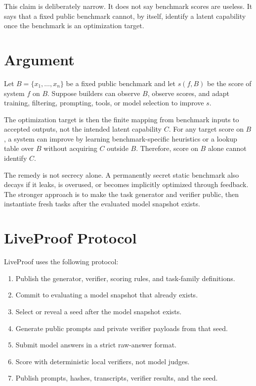 \documentclass[11pt]{article}
\begin{document}
This claim is deliberately narrow. It does not say benchmark scores are useless.
It says that a fixed public benchmark cannot, by itself, identify a latent
capability once the benchmark is an optimization target.

\section{Argument}

Let $B = \{x_1, \ldots, x_n\}$ be a fixed public benchmark and let $s(f, B)$ be
the score of system $f$ on $B$. Suppose builders can observe $B$, observe scores,
and adapt training, filtering, prompting, tools, or model selection to improve
$s$.

The optimization target is then the finite mapping from benchmark inputs to
accepted outputs, not the intended latent capability $C$. For any target score
on $B$, a system can improve by learning benchmark-specific heuristics or a
lookup table over $B$ without acquiring $C$ outside $B$. Therefore, score on $B$
alone cannot identify $C$.

The remedy is not secrecy alone. A permanently secret static benchmark also
decays if it leaks, is overused, or becomes implicitly optimized through
feedback. The stronger approach is to make the task generator and verifier
public, then instantiate fresh tasks after the evaluated model snapshot exists.

\section{LiveProof Protocol}

LiveProof uses the following protocol:

\begin{enumerate}
\item Publish the generator, verifier, scoring rules, and task-family definitions.
\item Commit to evaluating a model snapshot that already exists.
\item Select or reveal a seed after the model snapshot exists.
\item Generate public prompts and private verifier payloads from that seed.
\item Submit model answers in a strict raw-answer format.
\item Score with deterministic local verifiers, not model judges.
\item Publish prompts, hashes, transcripts, verifier results, and the seed.
\end{enumerate}
\end{document}
